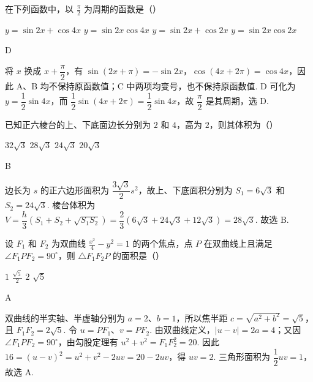 \documentclass[UTF8,a4paper,oneside,11pt]{ctexbook}
\begin{document}
\begin{problem}
在下列函数中，以 \(\frac{\pi}{2}\) 为周期的函数是（\quad）

\choices
    {\(y = \sin 2x + \cos 4x\)}
    {\(y = \sin 2x\cos 4x\)}
    {\(y = \sin 2x + \cos 2x\)}
    {\(y = \sin 2x\cos 2x\)}
\end{problem}

\begin{answer}
D
\end{answer}

\begin{solution}
将 \(x\) 换成 \(x+\dfrac{\pi}{2}\)，有 \(\sin(2x+\pi)=-\sin2x\)，\(\cos(4x+2\pi)=\cos4x\)，因此 A、B 均不保持原函数值；C 中两项均变号，也不保持原函数值. D 可化为 \(y=\dfrac12\sin4x\)，而 \(\dfrac12\sin\left(4x+2\pi\right)=\dfrac12\sin4x\)，故 \(\dfrac{\pi}{2}\) 是其周期，选 D.
\end{solution}

\begin{problem}
已知正六棱台的上、下底面边长分别为 \(2\) 和 \(4\)，高为 \(2\)，则其体积为（\quad）

\choices
    {\(32\sqrt{3}\)}
    {\(28\sqrt{3}\)}
    {\(24\sqrt{3}\)}
    {\(20\sqrt{3}\)}
\end{problem}

\begin{answer}
B
\end{answer}

\begin{solution}
边长为 \(s\) 的正六边形面积为 \(\dfrac{3\sqrt3}{2}s^{2}\)，故上、下底面积分别为 \(S_1=6\sqrt3\) 和 \(S_2=24\sqrt3\). 棱台体积为
\(V=\dfrac{h}{3}\left(S_1+S_2+\sqrt{S_1S_2}\right)=\dfrac{2}{3}\left(6\sqrt3+24\sqrt3+12\sqrt3\right)=28\sqrt3\). 故选 B.
\end{solution}

\begin{problem}
设 \(F_{1}\) 和 \(F_{2}\) 为双曲线 \(\frac{x^{2}}{4} - y^{2} = 1\) 的两个焦点，点 \(P\) 在双曲线上且满足 \(\angle F_{1}PF_{2} = 90^{\circ}\)，则 \(\triangle F_{1}F_{2}P\) 的面积是（\quad）

\choices
    {\(1\)}
    {\(\frac{\sqrt{5}}{2}\)}
    {\(2\)}
    {\(\sqrt{5}\)}
\end{problem}

\begin{answer}
A
\end{answer}

\begin{solution}
双曲线的半实轴、半虚轴分别为 \(a=2\)、\(b=1\)，所以焦半距 \(c=\sqrt{a^{2}+b^{2}}=\sqrt5\)，且 \(F_1F_2=2\sqrt5\). 令 \(u=PF_1\)、\(v=PF_2\). 由双曲线定义，\(|u-v|=2a=4\)；又因 \(\angle F_1PF_2=90^{\circ}\)，由勾股定理有 \(u^{2}+v^{2}=F_1F_2^{2}=20\). 因此 \(16=(u-v)^2=u^2+v^2-2uv=20-2uv\)，得 \(uv=2\). 三角形面积为 \(\dfrac12uv=1\)，故选 A.
\end{solution}
\end{document}

